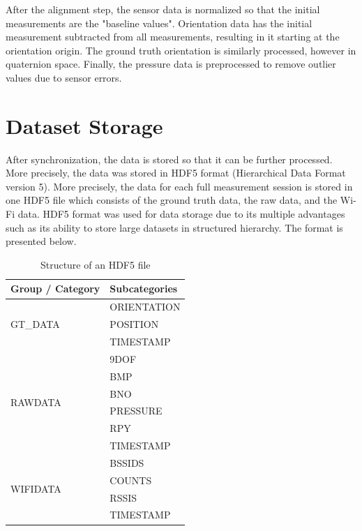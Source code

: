 After the alignment step, the sensor data is normalized so that the initial measurements are the "baseline values". Orientation data has the initial measurement subtracted from all measurements, resulting in it starting at the orientation origin. The ground truth orientation is similarly processed, however in quaternion space. Finally, the pressure data is preprocessed to remove outlier values due to sensor errors.

\section{Dataset Storage}
After synchronization, the data is stored so that it can be further processed. More precisely, the data was stored in HDF5 format (Hierarchical Data Format version 5). More precisely, the data for each full measurement session is stored in one HDF5 file which consists of the ground truth data, the raw data, and the Wi-Fi data. HDF5 format was used for data storage due to its multiple advantages such as its ability to store large datasets in structured hierarchy. The format is presented below.  \cite{hierarchical}
\par
\begin{table}[h!]
\centering
\renewcommand{\arraystretch}{1.1} %
\setlength{\tabcolsep}{8pt} %
\begin{tabular}{|l|l|}
\hline
\textbf{Group / Category} & \textbf{Subcategories} \\ \hline
\multirow{3}{*}{GT\_DATA}  & ORIENTATION            \\ \cline{2-2}
                           & POSITION               \\ \cline{2-2}
                           & TIMESTAMP              \\ \hline
\multirow{6}{*}{RAWDATA}   & 9DOF                   \\ \cline{2-2}
                           & BMP                    \\ \cline{2-2}
                           & BNO                    \\ \cline{2-2}
                           & PRESSURE               \\ \cline{2-2}
                           & RPY                    \\ \cline{2-2}
                           & TIMESTAMP              \\ \hline
\multirow{4}{*}{WIFIDATA}  & BSSIDS                 \\ \cline{2-2}
                           & COUNTS                 \\ \cline{2-2}
                           & RSSIS                  \\ \cline{2-2}
                           & TIMESTAMP              \\ \hline
\end{tabular}
\caption{Structure of an HDF5 file}
\label{tab:hdf5_structure}
\end{table}

